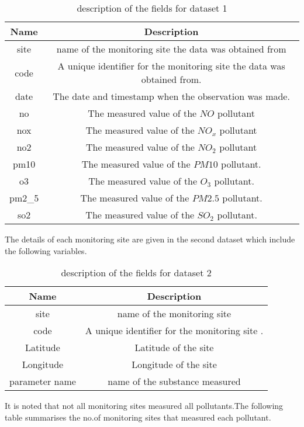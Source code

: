 \documentclass[]{article}
\begin{document}
\begin{table}[H]
	\centering
	\begin{tabular}{|c|c|}\hline
		\textbf{Name} & \textbf{Description} \\\hline
		site & name of the monitoring site the data 
		was obtained from \\\hline
		code & A unique identifier for the monitoring site the data 
		was obtained from. \\\hline
		date & The date and timestamp when the observation was 
		made. \\\hline
		no & The measured value of the $NO$ pollutant \\\hline
		nox & The measured value of the $NO_x$ pollutant \\\hline
		no2 & The measured value of the $NO_2$ pollutant \\\hline
		pm10 & The measured value of the $PM10$ pollutant. \\\hline
		o3 & The measured value of the $O_3$ pollutant. \\\hline
		pm2\_5 & The measured value of the $PM2.5$ pollutant. \\\hline
		so2 & The measured value of the $SO_2$ pollutant. \\\hline
		
	\end{tabular}
	\caption{description of the fields for dataset 1}
	\label{table_1}
\end{table}
 The details of each monitoring site are given in the second dataset which include the following variables.
 \begin{table}[H]
 	\centering
 	\begin{tabular}{|c|c|}\hline
 		\textbf{Name} & \textbf{Description} \\\hline
 		site & name of the monitoring site  \\\hline
 		code & A unique identifier for the monitoring site . \\\hline
 		Latitude & Latitude of the site \\\hline
 		Longitude & Longitude of the site \\\hline
 		parameter name & name of the substance measured\\\hline
 	\end{tabular}
 	\caption{description of the fields for dataset 2}
 	\label{table_2}
 \end{table}
It is noted that not all monitoring sites measured all pollutants.The following table summarises the no.of monitoring sites that measured each pollutant.
\end{document}
